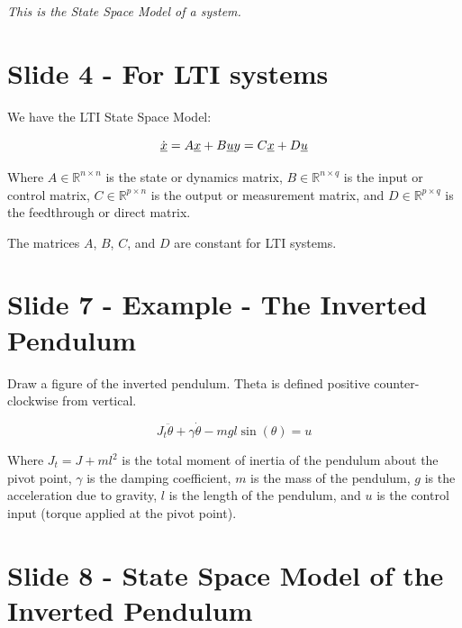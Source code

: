 \documentclass[
  letterpaper,
  DIV=11,
  numbers=noendperiod]{scrreprt}
\begin{document}
\emph{This is the State Space Model of a system.}

\section{Slide 4 - For LTI systems}\label{slide-4---for-lti-systems}

We have the LTI State Space Model:

\[\dot{\underline{x}} = A \underline{x} + B \underline{u} \\
y = C \underline{x} + D \underline{u}\]

Where \(A \in \mathbb{R}^{n \times n}\) is the state or dynamics matrix,
\(B \in \mathbb{R}^{n \times q}\) is the input or control matrix,
\(C \in \mathbb{R}^{p \times n}\) is the output or measurement matrix,
and \(D \in \mathbb{R}^{p \times q}\) is the feedthrough or direct
matrix.

The matrices \(A\), \(B\), \(C\), and \(D\) are constant for LTI
systems.

\section{Slide 7 - Example - The Inverted
Pendulum}\label{slide-7---example---the-inverted-pendulum}

\begin{tcolorbox}[enhanced jigsaw, arc=.35mm, bottomrule=.15mm, bottomtitle=1mm, breakable, colback=white, colbacktitle=quarto-callout-note-color!10!white, colframe=quarto-callout-note-color-frame, coltitle=black, left=2mm, leftrule=.75mm, opacityback=0, opacitybacktitle=0.6, rightrule=.15mm, title=\textcolor{quarto-callout-note-color}{\faInfo}\hspace{0.5em}{Note}, titlerule=0mm, toprule=.15mm, toptitle=1mm]

Draw a figure of the inverted pendulum. Theta is defined positive
counter-clockwise from vertical.

\end{tcolorbox}

\[J_t\ddot{\theta} + \gamma\dot{\theta} - mgl\sin(\theta) = u\]

Where \(J_t = J + ml^2\) is the total moment of inertia of the pendulum
about the pivot point, \(\gamma\) is the damping coefficient, \(m\) is
the mass of the pendulum, \(g\) is the acceleration due to gravity,
\(l\) is the length of the pendulum, and \(u\) is the control input
(torque applied at the pivot point).

\section{Slide 8 - State Space Model of the Inverted
Pendulum}\label{slide-8---state-space-model-of-the-inverted-pendulum}
\end{document}
